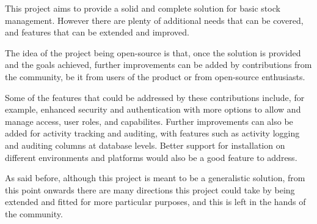 This project aims to provide a solid and complete solution for basic stock management. However there are plenty of additional needs that can be covered, and features that can be extended and improved.

The idea of the project being open-source is that, once the solution is provided and the goals achieved, further improvements can be added by contributions from the community, be it from users of the product or from open-source enthusiasts.

Some of the features that could be addressed by these contributions include, for example, enhanced security and authentication with more options to allow and manage access, user roles, and capabilites. Further improvements can also be added for activity tracking and auditing, with features such as activity logging and auditing columns at database levels. Better support for installation on different environments and platforms would also be a good feature to address.

As said before, although this project is meant to be a generalistic solution, from this point onwards there are many directions this project could take by being extended and fitted for more particular purposes, and this is left in the hands of the community.